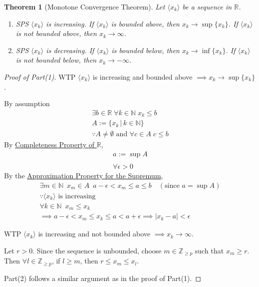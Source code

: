 \documentclass[11pt, oneside]{book}
\theoremstyle{break}
\newtheorem{thm}{Theorem}[section]
\newtheorem*{proof}{Proof}
\newcommand{\bb}[1]{\mathbb{#1}}			%
\begin{document}
\begin{thm}[Monotone Convergence Theorem]\label{monotone_convergence}
	Let $\langle x_k \rangle$ be a sequence in $\bb{R}$.
	\begin{enumerate}
		\item SPS $\langle x_k \rangle$ is increasing. If $\langle x_k \rangle$ is bounded above, then $x_k \to \sup \{x_k\}$. If $\langle x_k \rangle$ is not bounded above, then $x_k \to \infty$.
		\item SPS $\langle x_k \rangle$ is decreasing. If $\langle x_k \rangle$ is bounded below, then $x_k \to \inf \{x_k\}$. If $\langle x_k \rangle$ is not bounded below, then $x_k \to -\infty$.
	\end{enumerate}
\end{thm}

\begin{proof}
	[Proof of Part(1)]

	WTP $\langle x_k \rangle$ is increasing and bounded above $\implies x_k \to \sup \{x_k\}$.

	By assumption
	\begin{gather*}
		\exists b \in \bb{R} \; \forall k \in \bb{N} \; x_k \leq b \\
		A := \{ x_k \, | \, k \in \bb{N} \} \\
		\because A \neq \emptyset \text{ and } \forall c \in A \; c \leq b
	\end{gather*}
	By \hyperref[completeness_R]{Completeness Property of $\bb{R}$},
	\begin{gather*}
		a := \sup A \\
		\\
		\forall \epsilon > 0
	\end{gather*}
	By the \hyperref[approx_prop]{Approximation Property for the Supremum},
	\begin{gather*}
		\exists m \in \bb{N} \enspace x_m \in A \enspace a - \epsilon < x_m \leq a \leq b \quad (\text{since } a = \sup A) \\
		\because \langle x_k \rangle \text{ is increasing} \\
		\forall k \in \bb{N} \enspace x_m \leq x_k \\
		\implies a - \epsilon < x_m \leq x_k \leq a < a + \epsilon \implies |x_k - a| < \epsilon
	\end{gather*}

	WTP $\langle x_k \rangle$ is increasing and not bounded above $\implies x_k \to \infty$.

	Let $r > 0$. Since the sequence is unbounded, choose $m \in \bb{Z}_{\geq p}$ such that $x_m \geq r$. Then $\forall l \in \bb{Z}_{\geq p}$, if $l \geq m$, then $r \leq x_m \leq x_l$.

	Part(2) follows a similar argument as in the proof of Part(1).
\end{proof}
\end{document}
